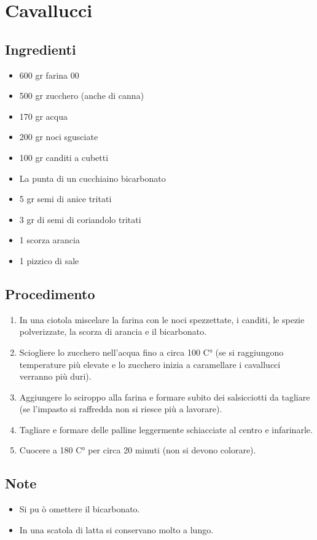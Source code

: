 \section{Cavallucci}
\subsection{Ingredienti}
\begin{itemize}
\item 600 gr farina 00  
\item 500 gr zucchero (anche di canna)  
\item 170 gr acqua  
\item 200 gr noci sgusciate  
\item 100 gr canditi a cubetti  
\item La punta di un cucchiaino bicarbonato   
\item 5 gr semi di anice tritati  
\item 3 gr di semi di coriandolo tritati  
\item 1 scorza arancia  
\item 1 pizzico di sale
\end{itemize}
\subsection{Procedimento}
\begin{enumerate}
\item  In una ciotola miscelare la farina con le noci spezzettate, i canditi, le spezie polverizzate, la scorza di arancia e il bicarbonato.  
\item  Sciogliere lo zucchero nell'acqua fino a circa 100 C° (se si raggiungono temperature più elevate e lo zucchero inizia a caramellare i cavallucci verranno più duri).  
\item  Aggiungere lo sciroppo alla farina e formare subito dei salsicciotti da tagliare (se l'impasto si raffredda non si riesce più a lavorare).  
\item  Tagliare e formare delle palline leggermente schiacciate al centro e infarinarle.  
\item  Cuocere a 180 C° per circa 20 minuti (non si devono colorare).
\end{enumerate}
\subsection{Note}
\begin{itemize}
\item Si pu ò omettere il bicarbonato.  
\item In una scatola di latta si conservano molto a lungo.
\end{itemize}

